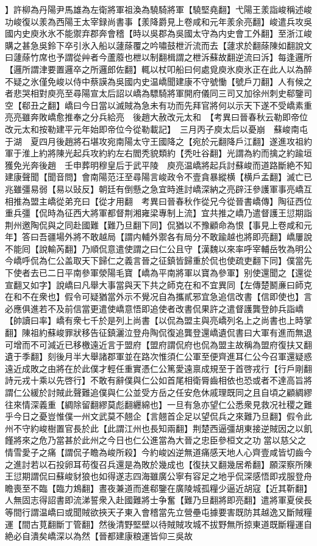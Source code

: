 】許柳為丹陽尹馬雄為左衛將軍祖渙為驍騎將軍【驍堅堯翻】弋陽王羕詣峻稱述峻功峻復以羕為西陽王太宰録尚書事【羕降爵見上卷咸和元年羕余亮翻】峻遣兵攻吳國内史庾氷氷不能禦弃郡奔會稽【時以吳郡為吳國太守為内史會工外翻】至浙江峻購之甚急吳鈴下卒引氷入船以蘧蒢覆之吟嘯鼓枻沂流而去【蘧求於翻蒢陳如翻說文曰蘧蒢竹席也予謂從艸者今蘆䕠也枻以制翻楫謂之枻泝蘇故翻逆流曰泝】每逢邏所【邏所謂津要置邏卒之所邏郎佐翻】輒以杖叩船曰何處覓庾氷庾氷正在此人以為醉不疑之氷僅免峻以侍中蔡謨為吳國内史温嶠聞建康不守號慟【號戶刀翻】人有候之者悲哭相對庾亮至尋陽宣太后詔以嶠為驃騎將軍開府儀同三司又加徐州刺史郗鑒司空【郗丑之翻】嶠曰今日當以滅賊為急未有功而先拜官將何以示天下遂不受嶠素重亮亮雖奔敗嶠愈推奉之分兵給亮　後趙大赦改元太和　【考異曰晉春秋云勒即帝位改元太和按勒建平元年始即帝位今從勒載記】　三月丙子庾太后以憂崩　蘇峻南屯于湖　夏四月後趙將石堪攻宛南陽太守王國降之【宛於元翻降戶江翻】遂進攻祖約軍于淮上約將陳光起兵攻約約左右閻秃貌類約【秃吐谷翻】光謂為約而擒之約踰垣獲免光奔後趙　壬申葬明穆皇后于武平陵　庾亮温嶠將起兵討蘇峻而道路斷絶不知建康聲聞【聞音問】會南陽范汪至尋陽言峻政令不壹貪暴縱横【横戶孟翻】滅亡已兆雖彊易弱【易以䜴反】朝廷有倒懸之急宜時進討嶠深納之亮辟汪參護軍事亮嶠互相推為盟主嶠從弟充曰【從才用翻　考異曰晉春秋作從兄今從晉書嶠傳】陶征西位重兵彊【侃時為征西大將軍都督荆湘雍梁專制上流】宜共推之嶠乃遣督護王愆期詣荆州邀陶侃與之同赴國難【難乃旦翻下同】侃猶以不豫顧命為恨【事見上卷咸和元年】答曰吾疆場外將不敢越局【謂内輔外禦各有局分不敢踰越也將即亮翻】嶠屢說不能囘【說輸芮翻】乃順侃意遣使謂之曰仁公且守【漢魏以來率呼宰輔岳牧為明公今嶠呼侃為仁公盖取天下歸仁之義言晉之征鎮皆歸重於侃也使疏吏翻下同】僕當先下使者去已二日平南參軍滎陽毛寶【嶠為平南將軍以寶為參軍】别使還聞之【還從宣翻又如字】說嶠曰凡舉大事當與天下共之師克在和不宜異同【左傳楚鬭亷曰師克在和不在衆也】假令可疑猶當外示不覺况自為攜貳邪宜急追信改書【信即使也】言必應俱進若不及前信當更遣使嶠意悟即追使者改書侃果許之遣督護龔登帥兵詣嶠【帥讀曰率】嶠有衆七千於是列上尚書【以侃為盟主與亮嶠列名上之尚書也上時掌翻】陳祖約蘇峻罪狀移告征鎮灑泣登舟陶侃復追龔登還嶠遺侃書曰大軍有進而無退可增而不可減近已移檄遠近言于盟府【盟府謂侃府也侃為盟主故稱為盟府復扶又翻遺于季翻】刻後月半大舉諸郡軍並在路次惟須仁公軍至便齊進耳仁公今召軍還疑惑遠近成敗之由將在於此僕才輕任重實憑仁公篤愛遠禀成規至于首啓戎行【行戶剛翻詩元戎十乘以先啓行】不敢有辭僕與仁公如首尾相衛脣齒相依也恐或者不達高旨將謂仁公緩於討賊此聲難追僕與仁公並受方岳之任安危休戚理既同之且自頃之顧綢繆往來情深義重【綢除留翻繆莫彪翻纒綿也】一旦有急亦望仁公悉衆見救况社稷之難乎今日之憂豈惟僕一州文武莫不翹企【言翹首企足以望侃兵之來難乃旦翻】假令此州不守約峻樹置官長於此【此謂江州也長知兩翻】荆楚西逼彊胡東接逆賊因之以飢饉將來之危乃當甚於此州之今日也仁公進當為大晉之忠臣參桓文之功當以慈父之情雪愛子之痛【謂侃子瞻為峻所殺】今約峻凶逆無道痛感天地人心齊壹咸皆切齒今之進討若以石投卵耳苟復召兵還是為敗於幾成也【復扶又翻幾居希翻】願深察所陳王愆期謂侃曰蘇峻豺狼也如得遂志四海雖廣公寧有容足之地乎侃深感悟即戎服登舟瞻喪至不臨【臨力鴆翻】晝夜兼道而進郗鑒在廣陵城孤糧少逼近胡寇【近其靳翻】人無固志得詔書即流涕誓衆入赴國難將士争奮【難乃旦翻將即亮翻】遣將軍夏侯長等間行謂温嶠曰或聞賊欲挾天子東入會稽當先立營壘屯據要害既防其越逸又斷賊糧運【間古莧翻斷丁管翻】然後清野堅壁以待賊賊攻城不拔野無所掠東道既斷糧運自絶必自潰矣嶠深以為然【晉都建康粮運皆仰三吳故